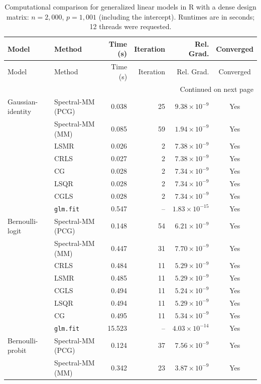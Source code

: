 \documentclass[10pt,a4paper]{article}
\begin{document}
\clearpage
\begingroup
\small
\setlength{\tabcolsep}{5pt}
\begin{longtable}{llrrrc}
\caption{Computational comparison for generalized linear models in R with a dense design matrix: $n=2{,}000$, $p=1{,}001$ (including the intercept). Runtimes are in seconds; 12 threads were requested.}
\label{tab:R-dense-glm-strict}\\
\toprule
Model & Method & Time (s) & Iteration & Rel. Grad. & Converged \\
\midrule
\endfirsthead
\toprule
Model & Method & Time (s) & Iteration & Rel. Grad. & Converged \\
\midrule
\endhead
\midrule
\multicolumn{6}{r}{Continued on next page}\\
\endfoot
\bottomrule
\endlastfoot
Gaussian-identity & Spectral-MM (PCG) & 0.038 & 25 & $9.38\times10^{-9}$ & Yes \\
 & Spectral-MM (MM) & 0.085 & 59 & $1.94\times10^{-9}$ & Yes \\
 & LSMR & 0.026 & 2 & $7.38\times10^{-9}$ & Yes \\
 & CRLS & 0.027 & 2 & $7.38\times10^{-9}$ & Yes \\
 & CG & 0.028 & 2 & $7.34\times10^{-9}$ & Yes \\
 & LSQR & 0.028 & 2 & $7.34\times10^{-9}$ & Yes \\
 & CGLS & 0.028 & 2 & $7.34\times10^{-9}$ & Yes \\
 & \texttt{glm.fit} & 0.547 & -- & $1.83\times10^{-15}$ & Yes \\
\midrule
Bernoulli-logit & Spectral-MM (PCG) & 0.148 & 54 & $6.21\times10^{-9}$ & Yes \\
 & Spectral-MM (MM) & 0.447 & 31 & $7.70\times10^{-9}$ & Yes \\
 & CRLS & 0.484 & 11 & $5.29\times10^{-9}$ & Yes \\
 & LSMR & 0.485 & 11 & $5.29\times10^{-9}$ & Yes \\
 & CGLS & 0.494 & 11 & $5.24\times10^{-9}$ & Yes \\
 & LSQR & 0.494 & 11 & $5.29\times10^{-9}$ & Yes \\
 & CG & 0.495 & 11 & $5.34\times10^{-9}$ & Yes \\
 & \texttt{glm.fit} & 15.523 & -- & $4.03\times10^{-14}$ & Yes \\
\midrule
Bernoulli-probit & Spectral-MM (PCG) & 0.124 & 37 & $7.56\times10^{-9}$ & Yes \\
 & Spectral-MM (MM) & 0.342 & 23 & $3.87\times10^{-9}$ & Yes \\

\end{longtable}
\end{document}
